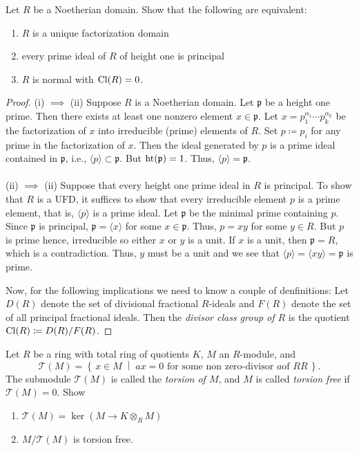 \begin{problem}
Let $R$ be a Noetherian domain. Show that the following are equivalent:
\begin{enumerate}[label=(\roman*)]
\item $R$ is a unique factorization domain
\item every prime ideal of $R$ of height one is principal
\item $R$ is normal with $\operatorname{Cl}(R)=0$.
\end{enumerate}
\end{problem}
\begin{proof}
(i) $\implies$ (ii) Suppose $R$ is a Noetherian domain. Let $\mathfrak{p}$
be a height one prime. Then there exists at least one nonzero element
$x\in\mathfrak{p}$. Let $x=p_1^{\alpha_1}\cdots p_k^{\alpha_k}$ be the
factorization of $x$ into irreducible (prime) elements of $R$. Set
$p\coloneqq p_i$ for any prime in the factorization of $x$. Then the ideal
generated by $p$ is a prime ideal contained in $\mathfrak{p}$, i.e.,
$\langle p \rangle\subset\mathfrak{p}$. But $\operatorname{ht}(\mathfrak{p})=1$. Thus,
$\langle p \rangle=\mathfrak{p}$.
\\\\
(ii) $\implies$ (ii) Suppose that every height one prime ideal in $R$ is
principal. To show that $R$ is a UFD, it suffices to show that every
irreducible element $p$ is a prime element, that is, $\langle p\rangle$ is
a prime ideal. Let $\mathfrak{p}$ be the minimal prime containing
$p$. Since $\mathfrak{p}$ is principal, $\mathfrak{p}=\langle x\rangle$ for
some $x\in\mathfrak{p}$. Thus, $p=xy$ for some $y\in R$. But $p$ is prime
hence, irreducible so either $x$ or $y$ is a unit. If $x$ is a unit, then
$\mathfrak{p}=R$, which is a contradiction. Thus, $y$ must be a unit and we
see that $\langle p\rangle=\langle xy\rangle=\mathfrak{p}$ is
prime.

Now, for the following implications we need to know a couple of
denfinitions: Let $D(R)$ denote the set of divisional fractional $R$-ideals
and $F(R)$ denote the set of all principal fractional ideals. Then the
\emph{divisor class group of $R$} is the quotient $\operatorname{Cl}(R)\coloneqq
D(R)/F(R)$.


\end{proof}
\newpage
\begin{problem}
Let $R$ be a ring with total ring of quotients $K$, $M$ an $R$-module, and
\[
\mathcal{T}(M)=\left\{\,x\in M\;\middle|\;\text{$ax=0$ for some non zero-divisor $a$
    of $RR$}\,\right\}.
\]
The submodule $\mathcal{T}(M)$ is called the \emph{torsion of $M$}, and $M$ is called
\emph{torsion free} if $\mathcal{T}(M)=0$. Show
\begin{enumerate}[label=(\alph*)]
\item $\mathcal{T}(M)=\ker(M\to K\otimes_R M)$
\item $M/\mathcal{T}(M)$ is torsion free.
\end{enumerate}
\end{problem}
